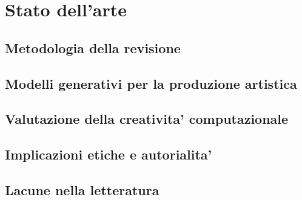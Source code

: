 \chapter{Stato dell'arte}
\label{cap:stato-arte}


\section{Metodologia della revisione}
\label{sec:metodologia-revisione}

\section{Modelli generativi per la produzione artistica}
\label{sec:sota-modelli}

\section{Valutazione della creativita' computazionale}
\label{sec:sota-valutazione}

\section{Implicazioni etiche e autorialita'}
\label{sec:sota-etica}

\section{Lacune nella letteratura}
\label{sec:gap}
